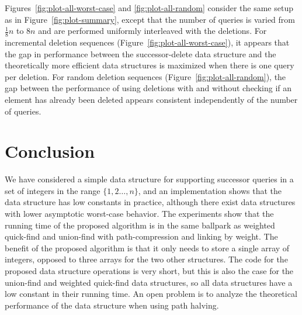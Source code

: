 \documentclass[a4paper]{lipics-v2021}
\begin{document}
Figures~\ref{fig:plot-all-worst-case} and \ref{fig:plot-all-random} consider the same setup as in Figure~\ref{fig:plot-summary}, except that the number of queries is varied from $\frac{1}{8}n$ to $8n$ and are performed uniformly interleaved with the deletions. 
For incremental deletion sequences (Figure~\ref{fig:plot-all-worst-case}), it appears that the gap in performance between the successor-delete data structure and the theoretically more efficient data structures is maximized when there is one query per deletion. 
For random deletion sequences (Figure~\ref{fig:plot-all-random}), the gap between the performance of using deletions with and without checking if an element has already been deleted appears consistent independently of the number of queries.

\section{Conclusion}

We have considered a simple data structure for supporting successor queries in a set of integers in the range $\{1,2\ldots,n\}$, and an implementation shows that the data structure has low constants in practice, although there exist data structures with lower asymptotic worst-case behavior. The experiments show that the running time of the proposed algorithm is in the same ballpark as weighted quick-find and union-find with path-compression and linking by weight. The benefit of the proposed algorithm is that it only needs to store a single array of integers, opposed to three arrays for the two other structures. The code for the proposed data structure operations is very short, but this is also the case for the union-find and weighted quick-find data structures, so all data structures have a low constant in their running time. An open problem is to analyze the theoretical performance of the data structure when using path halving.





\end{document}
